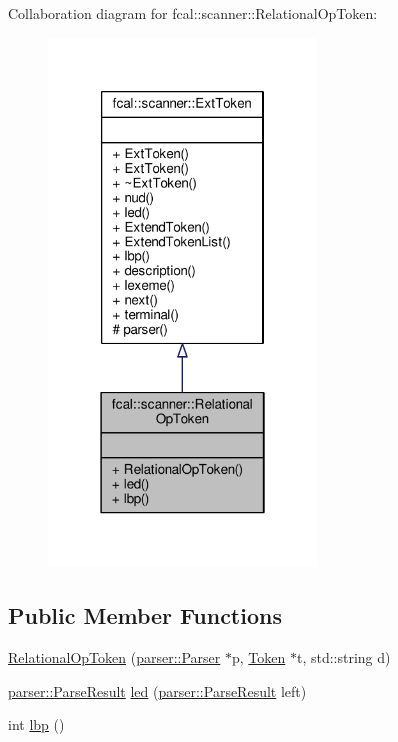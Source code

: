 Collaboration diagram for fcal\+:\+:scanner\+:\+:Relational\+Op\+Token\+:
\nopagebreak
\begin{figure}[H]
\begin{center}
\leavevmode
\includegraphics[width=202pt]{classfcal_1_1scanner_1_1RelationalOpToken__coll__graph}
\end{center}
\end{figure}
\subsection*{Public Member Functions}
\begin{DoxyCompactItemize}
\item 
\hyperlink{classfcal_1_1scanner_1_1RelationalOpToken_a0f7df80e780e0f43e31536d2d528d596}{Relational\+Op\+Token} (\hyperlink{classfcal_1_1parser_1_1Parser}{parser\+::\+Parser} $\ast$p, \hyperlink{classfcal_1_1scanner_1_1Token}{Token} $\ast$t, std\+::string d)
\item 
\hyperlink{classfcal_1_1parser_1_1ParseResult}{parser\+::\+Parse\+Result} \hyperlink{classfcal_1_1scanner_1_1RelationalOpToken_aeb44d196866916b7d121da40a1d318f1}{led} (\hyperlink{classfcal_1_1parser_1_1ParseResult}{parser\+::\+Parse\+Result} left)
\item 
int \hyperlink{classfcal_1_1scanner_1_1RelationalOpToken_ac96b280b7e5993c93d7b245deaefffb1}{lbp} ()
\end{DoxyCompactItemize}
